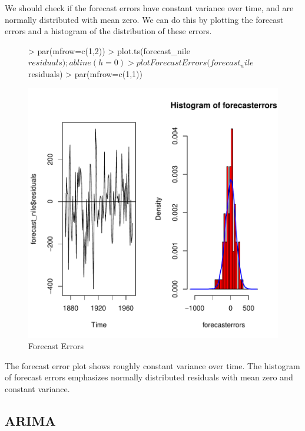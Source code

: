 \documentclass[10pt, a4paper]{article} %
\begin{document}
\noindent We should check if the forecast errors have constant variance over time, and are normally distributed with mean zero. We can do this by plotting the forecast errors and a histogram of the distribution of these errors.

\begin{figure}[H]
\centering
\begin{Schunk}
\begin{Sinput}
> par(mfrow=c(1,2))
> plot.ts(forecast_nile$residuals);abline(h=0)
> plotForecastErrors(forecast_nile$residuals)
> par(mfrow=c(1,1))
\end{Sinput}
\end{Schunk}
\includegraphics{FINAL_VERSION-096}
\caption{Forecast Errors}
\end{figure}

\noindent The forecast error plot shows roughly constant variance over time. The histogram of forecast errors emphasizes normally distributed residuals with mean zero and constant variance.

\subsection{ARIMA}
\end{document}
